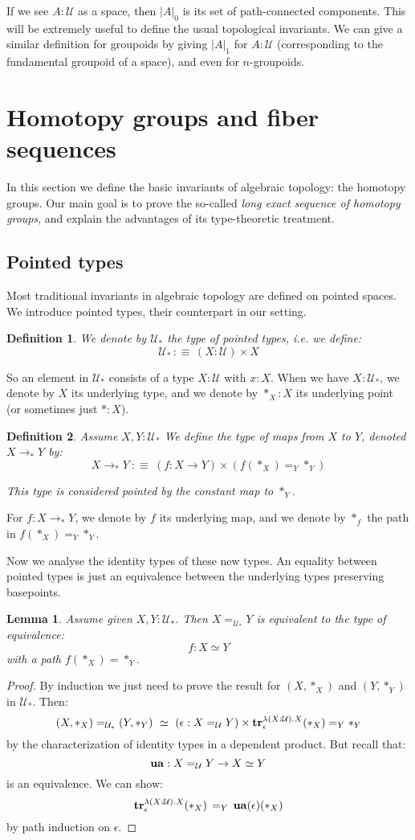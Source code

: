 \documentclass{article}
\newcommand{\se}[1]{\medbreak \medbreak \section{#1}}
\newcommand{\sse}[1]{\medbreak \subsection{#1}}
\newcommand{\U}{{\mathcal U}}
\renewcommand{\r}{\rightarrow}
\newcommand{\Gl}{\lambda}
\newcommand{\tr}{\mathrm{\bf tr}}
\newcommand{\ua}{\mathrm{\bf ua}}
\newcommand{\Map}{\mathrm{Map}}
\newtheorem{lemma}{Lemma}
\newtheorem{definition}{Definition}
\begin{document}
If we see $A:\U$ as a space, then $|A|_0$ is its set of path-connected components. This will be extremely useful to define the usual topological invariants. We can give a similar definition for groupoids by giving $|A|_1$ for $A:\U$ (corresponding to the fundamental groupoid of a space), and even for $n$-groupoids.







\se{Homotopy groups and fiber sequences}

In this section we define the basic invariants of algebraic topology: the homotopy groups. Our main goal is to prove the so-called \emph{long exact sequence of homotopy groups}, and explain the advantages of its type-theoretic treatment.%


\sse{Pointed types}

Most traditional invariants in algebraic topology are defined on pointed spaces. We introduce pointed types, their counterpart in our setting.

\begin{definition}
We denote by $\U_*$ the type of pointed types, i.e. we define:
\[\U_* \, :\equiv\, (X:\U)\times X\]
\end{definition}

So an element in $\U_*$ consists of a type $X:\U$ with $x:X$. When we have $X:\U_*$, we denote by $X$ its underlying type, and we denote by $*_X:X$ its underlying point (or sometimes just $*:X$).

\begin{definition}
Assume $X, Y:\U_*$ We define the type of maps from $X$ to $Y$, denoted $X\r_*Y$ by:
\[X\r_*Y \ :\equiv\ (f:X\r Y)\times (f(*_X) =_Y *_Y)\]

This type is considered pointed by the constant map to $*_Y$.
\end{definition}

For $f:X\r_*Y$, we denote by $f$ its underlying map, and we denote by $*_f$ the path in $f(*_X)=_Y*_Y$.


Now we analyse the identity types of these new types. An equality between pointed types is just an equivalence between the underlying types preserving basepoints.

\begin{lemma}
Assume given $X,Y:\U_*$. Then $X=_{\U_*} Y$ is equivalent to the type of equivalence:
\[f:X\simeq Y\]
 with a path $f(*_X)=*_Y$.
\end{lemma}
\begin{proof}
By induction we just need to prove the result for $(X,*_X)$ and $(Y,*_Y)$ in $\U_*$. Then:
\[(X,*_X) =_{\U_*}(Y,*_Y) \ \simeq \ (\epsilon : X=_\U Y)\times \tr_\epsilon^{\Gl(X:\U).X}(*_X) =_Y *_Y\]
by the characterization of identity types in a dependent product. But recall that: 
\[\ua : X=_\U Y\r X\simeq Y\] 
is an equivalence. We can show:
\[\tr_\epsilon^{\Gl(X:\U).X}(*_X) \, =_Y \, \ua(\epsilon)(*_X)\]
by path induction on $\epsilon$.
\end{proof}
\end{document}
